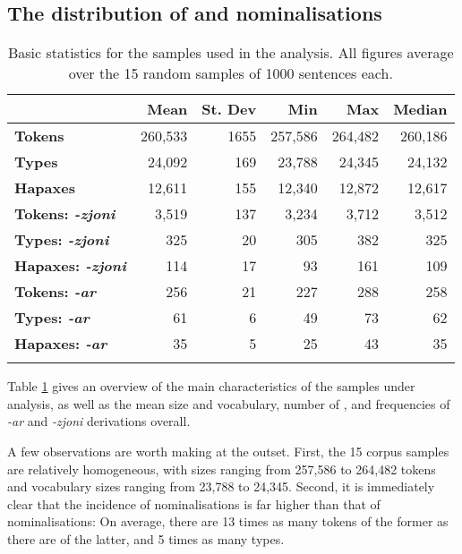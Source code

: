 \documentclass[output=paper]{LSP/langsci}
\begin{document}
\subsection{The distribution of {\ar} and {\zjoni} nominalisations}\label{sec:distribution}

\begin{table}[b]
\begin{tabularx}{\textwidth}{Xrrrrr}
\lsptoprule
& {Mean} & {St. Dev} & {Min} & {Max} & {Median} \\
\midrule
{\bf Tokens} & 260,533  & 1655 & 257,586 & 264,482 & 260,186\\
{\bf Types} & 24,092 & 169 & 23,788 & 24,345 & 24,132 \\
{\bf Hapaxes} & 12,611 & 155 & 12,340 & 12,872 & 12,617\\
\midrule
{\bf Tokens: \textit{-zjoni}} & 3,519 & 137 & 3,234 & 3,712 & 3,512\\
{\bf Types: \textit{-zjoni}} & 325 & 20 & 305 & 382 &  325\\
{\bf Hapaxes: \textit{-zjoni}} & 114 & 17 & 93 & 161 &  109\\
\midrule
{\bf Tokens: \textit{-ar}} & 256 & 21 & 227 & 288 &  258\\
{\bf Types: \textit{-ar}} & 61  & 6 & 49 & 73 & 62\\
{\bf Hapaxes: \textit{-ar}} & 35 & 5 & 25 & 43 & 35\\
\lspbottomrule
\end{tabularx}
\caption{Basic statistics for the samples used in the analysis. All figures average over the 15 random samples of 1000 sentences each.}
\label{table:gatt:samples}
\end{table}

Table \ref{table:gatt:samples} gives an overview of the main characteristics of the samples under analysis, as well as the mean size and vocabulary, number of , and frequencies of \textit{-ar} and \textit{-zjoni} derivations overall. 

A few observations are worth making at the outset. First, the 15 corpus samples are relatively homogeneous, with sizes ranging from 257,586 to 264,482 tokens and vocabulary sizes ranging from 23,788 to 24,345.  Second, it is immediately clear that the incidence of {\zjoni} nominalisations is far higher than that of {\ar} nominalisations: On average, there are 13 times as many tokens of the former as there are of the latter, and 5 times as many types. 
\end{document}
